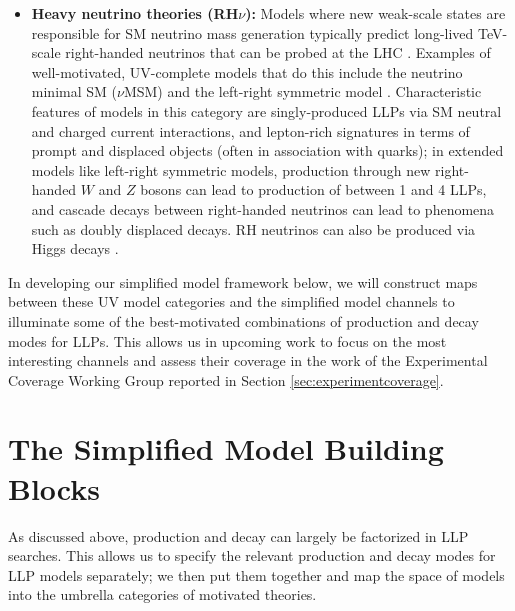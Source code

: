 \begin{itemize}
\item {\bf Heavy neutrino theories (RH$\nu$):}  Models where  new weak-scale states are responsible for SM neutrino mass generation \cite{Minkowski:1977sc,Yanagida:1979as,Mohapatra:1979ia,Glashow:1979nm,Mohapatra:1986bd} typically predict long-lived TeV-scale right-handed neutrinos that can be probed at the LHC \cite{Keung:1983uu,Ferrari:2000sp,Basso:2008iv,Perez:2009mu,Nemevsek:2011hz,Helo:2013esa,Izaguirre:2015pga,Maiezza:2015lza,Nemevsek:2016enw}. Examples of well-motivated, UV-complete models that do this include the neutrino minimal SM ($\nu$MSM) \cite{Asaka:2005an,Asaka:2005pn} and the left-right symmetric model \cite{Pati:1974yy,Mohapatra:1974gc,Senjanovic:1975rk,Senjanovic:1978ev}.  Characteristic features of models in this category are singly-produced LLPs via SM neutral and charged current interactions, and lepton-rich signatures in terms of prompt and displaced objects (often in association with quarks); in extended models like left-right symmetric models, production through new right-handed $W$ and $Z$ bosons can lead to production of between 1 and 4 LLPs, and cascade decays between right-handed neutrinos can lead to phenomena such as doubly displaced decays. RH neutrinos can also be produced via Higgs decays \cite{Graesser:2007yj, Graesser:2007pc,Maiezza:2015lza,Accomando:2016rpc,Das:2017rsu,Caputo:2017pit}.

\end{itemize}

%
In developing our simplified model framework below, we will construct maps between these UV model categories and the simplified model channels to illuminate some of the best-motivated combinations of production and decay modes for LLPs. This  allows us in upcoming work to focus on the most interesting channels and assess their coverage in the work of the Experimental Coverage Working Group reported in Section \ref{sec:experimentcoverage}.



\section{The Simplified Model Building Blocks}\label{sec:building_blocks}


As discussed above, production and decay can largely be factorized in LLP searches. This allows us to specify the relevant production and decay modes for LLP models separately; we then put them together and map the space of models into the umbrella categories of motivated theories.

